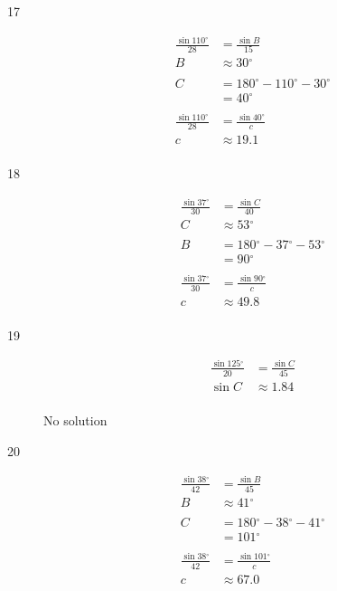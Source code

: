 \documentclass{exam}
\newcommand{\dg}{\ensuremath{^\circ}}
\begin{document}
\begin{description}
      \item[17] 
        \begin{align*}
          \frac{\sin 110 \dg}{28} & = \frac{\sin B}{15} \\
          B                       & \approx \boxed{ 30 \dg } \\
          \\
          C & = 180 \dg - 110 \dg - 30 \dg \\
            & = \boxed{ 40 \dg } \\
          \\
          \frac{\sin 110 \dg}{28} & = \frac{\sin 40 \dg}{c} \\
          c                       & \approx \boxed{ 19.1 } \\
        \end{align*}

      \item[18] 
        \begin{align*}
          \frac{\sin 37 \dg}{30} & = \frac{\sin C}{40} \\
          C                      & \approx \boxed{ 53 \dg } \\
          \\
          B & = 180 \dg - 37 \dg - 53 \dg \\
            & = \boxed{ 90 \dg } \\
          \\
          \frac{\sin 37 \dg}{30} & = \frac{\sin 90 \dg}{c} \\
          c                      & \approx \boxed{ 49.8 } \\
        \end{align*}

      \item[19] 
        \begin{align*}
          \frac{\sin 125 \dg}{20} & = \frac{\sin C}{45} \\
          \sin C                  & \approx 1.84 \\
        \end{align*}

        No solution

      \item[20] 
        \begin{align*}
          \frac{\sin 38 \dg}{42} & = \frac{\sin B}{45} \\
          B                      & \approx \boxed{ 41 \dg } \\
          \\
          C & = 180 \dg - 38 \dg - 41 \dg  \\
            & = \boxed{ 101 \dg } \\ 
          \\
          \frac{\sin 38 \dg}{42} & = \frac{\sin 101 \dg}{c} \\
          c                      & \approx \boxed{ 67.0 } \\
        \end{align*}


\end{description}
\end{document}
